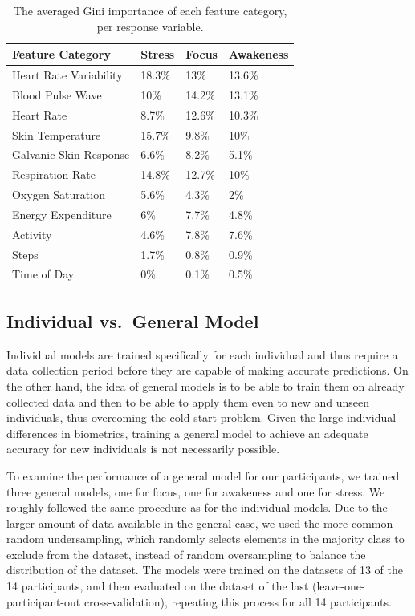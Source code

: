 \begin{table}[h!]
  \begin{centering}
  \begin{tabular}{llll}
    \hline
    Feature Category & Stress & Focus & Awakeness\\
    \hline
    Heart Rate Variability & 18.3\% & 13\% & 13.6\%\\
    Blood Pulse Wave & 10\% & 14.2\% & 13.1\%\\
    Heart Rate & 8.7\% & 12.6\% & 10.3\%\\
    Skin Temperature & 15.7\% & 9.8\% & 10\%\\
    Galvanic Skin Response & 6.6\% & 8.2\% & 5.1\%\\
    Respiration Rate & 14.8\% & 12.7\% & 10\%\\
    Oxygen Saturation & 5.6\% & 4.3\% & 2\%\\ 
    Energy Expenditure & 6\% & 7.7\% & 4.8\%\\
    Activity & 4.6\% & 7.8\% & 7.6\%\\
    Steps & 1.7\% & 0.8\% & 0.9\%\\
    Time of Day & 0\% & 0.1\% & 0.5\%\\
    \hline
  \end{tabular}
  \caption{The averaged Gini importance of each feature category, per response variable.}
  \label{tab:featureImportance}
  \end{centering}
  \vspace*{-2mm}
\end{table}

\subsection{Individual vs.\ General Model}
Individual models are trained specifically for each individual and thus require a data collection period before they are capable of making accurate predictions. On the other hand, the idea of general models is to be able to train them on already collected data and then  to be able to apply them even to new and unseen individuals, thus overcoming the cold-start problem. Given the large individual differences in biometrics, training a general model to achieve an adequate accuracy for new individuals is not necessarily possible. 

To examine the performance of a general model for our participants, we trained three general models, one for focus, one for awakeness and one for stress. We roughly followed the same procedure as for the individual models. Due to the larger amount of data available in the general case, we used the more common random undersampling, which randomly selects elements in the majority class to exclude from the dataset, instead of random oversampling to balance the distribution of the dataset. The models were trained on the datasets of 13 of the 14 participants, and then evaluated on the dataset of the last (leave-one-participant-out cross-validation), repeating this process for all 14 participants. 

